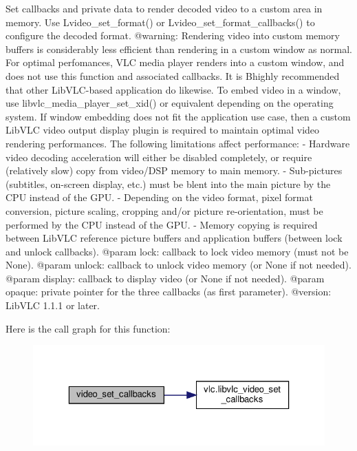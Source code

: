 \begin{DoxyVerb}Set callbacks and private data to render decoded video to a custom area
in memory.
Use L{video_set_format}() or L{video_set_format_callbacks}()
to configure the decoded format.
@warning: Rendering video into custom memory buffers is considerably less
efficient than rendering in a custom window as normal.
For optimal perfomances, VLC media player renders into a custom window, and
does not use this function and associated callbacks. It is B{highly
recommended} that other LibVLC-based application do likewise.
To embed video in a window, use libvlc_media_player_set_xid() or equivalent
depending on the operating system.
If window embedding does not fit the application use case, then a custom
LibVLC video output display plugin is required to maintain optimal video
rendering performances.
The following limitations affect performance:
- Hardware video decoding acceleration will either be disabled completely,
  or require (relatively slow) copy from video/DSP memory to main memory.
- Sub-pictures (subtitles, on-screen display, etc.) must be blent into the
  main picture by the CPU instead of the GPU.
- Depending on the video format, pixel format conversion, picture scaling,
  cropping and/or picture re-orientation, must be performed by the CPU
  instead of the GPU.
- Memory copying is required between LibVLC reference picture buffers and
  application buffers (between lock and unlock callbacks).
@param lock: callback to lock video memory (must not be None).
@param unlock: callback to unlock video memory (or None if not needed).
@param display: callback to display video (or None if not needed).
@param opaque: private pointer for the three callbacks (as first parameter).
@version: LibVLC 1.1.1 or later.
\end{DoxyVerb}
 Here is the call graph for this function\+:
\nopagebreak
\begin{figure}[H]
\begin{center}
\leavevmode
\includegraphics[width=323pt]{classvlc_1_1_media_player_a403510f3a743d0f553a5eaf83db7a0dc_cgraph}
\end{center}
\end{figure}
\mbox{\label{classvlc_1_1_media_player_a8fb5c5ae9f3a3f03ff8b286a8b2f07f9}} 
